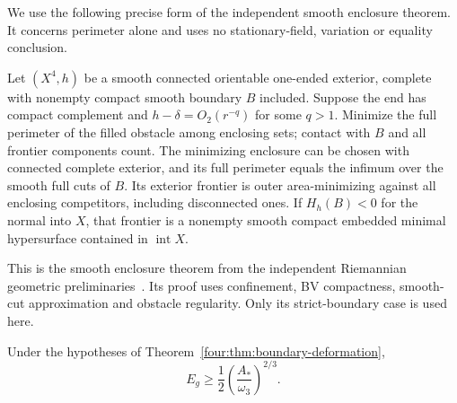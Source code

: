 We use the following precise form of the independent smooth enclosure
theorem. It concerns perimeter alone and uses no stationary-field,
variation or equality conclusion.

\begin{proposition}
\label{four:input:enclosure}
Let $(X^4,h)$ be a smooth connected orientable one-ended exterior, complete
with nonempty compact smooth boundary $B$ included. Suppose the end has
compact complement and $h-\delta=O_2(r^{-q})$ for some $q>1$. Minimize the
full perimeter of the filled obstacle among enclosing sets; contact with
$B$ and all frontier components count. The minimizing enclosure can be
chosen with connected complete exterior, and its full perimeter equals
the infimum over the smooth full cuts of $B$. Its exterior frontier is
outer area-minimizing against all enclosing competitors, including
disconnected ones. If $H_h(B)<0$ for the normal into $X$, that frontier
is a nonempty smooth compact embedded minimal hypersurface contained in
$\operatorname{int}X$.
\end{proposition}

This is the smooth enclosure theorem from the independent Riemannian
geometric preliminaries~\cite[Lemmas~2.1--2.3]{RiemannianCompanion}.
Its proof uses confinement, BV compactness,
smooth-cut approximation and obstacle regularity. Only its strict-boundary
case is used here.

\begin{corollary}
\label{four:thm:prepared-energy}
Under the hypotheses of Theorem~\ref{four:thm:boundary-deformation},
\begin{equation}\label{four:ex:prepared-inequality}
 E_g\ge\frac12\left(\frac{A_*}{\omega_3}\right)^{2/3}.
\end{equation}
\end{corollary}

